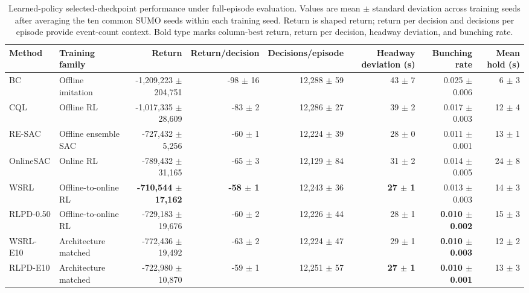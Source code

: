 \begin{table}[t]
\centering
\caption{Learned-policy selected-checkpoint performance under full-episode evaluation. Values are mean $\pm$ standard deviation across training seeds after averaging the ten common SUMO seeds within each training seed. Return is shaped return; return per decision and decisions per episode provide event-count context. Bold type marks column-best return, return per decision, headway deviation, and bunching rate.}
\label{tab:learned-selected-checkpoint}
\scriptsize
\renewcommand{\arraystretch}{1.00}
\setlength{\tabcolsep}{1.5pt}
\begin{tabular}{@{}llrrrrrr@{}}
\toprule
Method & Training family & Return & Return/decision & Decisions/episode & Headway deviation (s) & Bunching rate & Mean hold (s) \\
\midrule
BC & Offline imitation & -1,209,223 $\pm$ 204,751 & -98 $\pm$ 16 & 12,288 $\pm$ 59 & 43 $\pm$ 7 & 0.025 $\pm$ 0.006 & 6 $\pm$ 3 \\
CQL & Offline RL & -1,017,335 $\pm$ 28,609 & -83 $\pm$ 2 & 12,286 $\pm$ 27 & 39 $\pm$ 2 & 0.017 $\pm$ 0.003 & 12 $\pm$ 4 \\
RE-SAC & Offline ensemble SAC & -727,432 $\pm$ 5,256 & -60 $\pm$ 1 & 12,224 $\pm$ 39 & 28 $\pm$ 0 & 0.011 $\pm$ 0.001 & 13 $\pm$ 1 \\
OnlineSAC & Online RL & -789,432 $\pm$ 31,165 & -65 $\pm$ 3 & 12,129 $\pm$ 84 & 31 $\pm$ 2 & 0.014 $\pm$ 0.005 & 24 $\pm$ 8 \\
WSRL & Offline-to-online RL & \textbf{-710,544 $\pm$ 17,162} & \textbf{-58 $\pm$ 1} & 12,243 $\pm$ 36 & \textbf{27 $\pm$ 1} & 0.013 $\pm$ 0.003 & 14 $\pm$ 3 \\
RLPD-0.50 & Offline-to-online RL & -729,183 $\pm$ 19,676 & -60 $\pm$ 2 & 12,226 $\pm$ 44 & 28 $\pm$ 1 & \textbf{0.010 $\pm$ 0.002} & 15 $\pm$ 3 \\
WSRL-E10 & Architecture matched & -772,436 $\pm$ 19,492 & -63 $\pm$ 2 & 12,224 $\pm$ 47 & 29 $\pm$ 1 & \textbf{0.010 $\pm$ 0.003} & 12 $\pm$ 2 \\
RLPD-E10 & Architecture matched & -722,980 $\pm$ 10,870 & -59 $\pm$ 1 & 12,251 $\pm$ 57 & \textbf{27 $\pm$ 1} & \textbf{0.010 $\pm$ 0.001} & 13 $\pm$ 3 \\
\bottomrule
\end{tabular}
\end{table}
